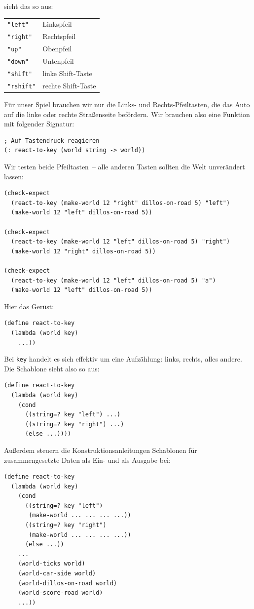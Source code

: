 sieht das so aus:
%
\begin{center}
  \begin{tabular}{l|l}
    {\lstinline!"left"!} & Linkspfeil\\
    {\lstinline!"right"!} & Rechtspfeil\\
    {\lstinline!"up"!} & Obenpfeil\\
    {\lstinline!"down"!} & Untenpfeil\\
    {\lstinline!"shift"!} & linke Shift-Taste\\
    {\lstinline!"rshift"!} & rechte Shift-Taste
  \end{tabular}
\end{center}
%
Für unser Spiel brauchen wir nur die Links- und Rechts-Pfeiltasten,
die das Auto auf die linke oder rechte Straßenseite befördern.   Wir
brauchen also eine Funktion mit folgender Signatur:
%
\begin{lstlisting}
; Auf Tastendruck reagieren
(: react-to-key (world string -> world))
\end{lstlisting}
%
Wir testen beide Pfeiltasten~-- alle anderen Tasten sollten die Welt
unverändert lassen:
%
\begin{lstlisting}
(check-expect
  (react-to-key (make-world 12 "right" dillos-on-road 5) "left")
  (make-world 12 "left" dillos-on-road 5))

(check-expect
  (react-to-key (make-world 12 "left" dillos-on-road 5) "right")
  (make-world 12 "right" dillos-on-road 5))
              
(check-expect
  (react-to-key (make-world 12 "left" dillos-on-road 5) "a")
  (make-world 12 "left" dillos-on-road 5))
\end{lstlisting}
%
Hier das Gerüst:
%
\begin{lstlisting}
(define react-to-key
  (lambda (world key)
    ...))
\end{lstlisting}
%
Bei \lstinline{key} handelt es sich effektiv um eine Aufzählung:
links, rechts, alles andere.  Die Schablone sieht also so aus:
%
\begin{lstlisting}
(define react-to-key
  (lambda (world key)
    (cond
      ((string=? key "left") ...)
      ((string=? key "right") ...)
      (else ...))))
\end{lstlisting}
%
Außerdem steuern die Konstruktionsanleitungen Schablonen für
zusammengesetzte Daten als Ein- und als Ausgabe bei:
%
\begin{lstlisting}
(define react-to-key
  (lambda (world key)
    (cond
      ((string=? key "left")
       (make-world ... ... ... ...))
      ((string=? key "right")
       (make-world ... ... ... ...))
      (else ...))
    ...
    (world-ticks world)
    (world-car-side world)
    (world-dillos-on-road world)
    (world-score-road world)
    ...))
\end{lstlisting}
